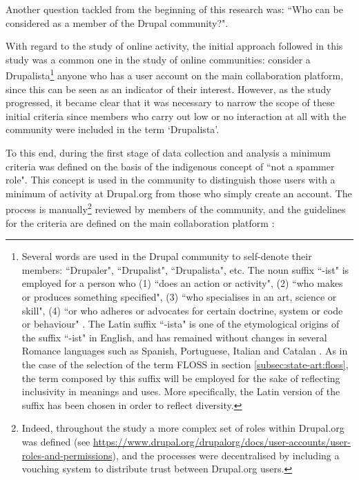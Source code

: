 Another question tackled from the beginning of this research was: ``Who can be considered as a member of the Drupal community?". 

With regard to the study of online activity, the initial approach followed in this study was a common one in the study of online communities: consider a Drupalista\footnote{Several words are used in the Drupal community to self-denote their members: ``Drupaler", ``Drupalist", ``Drupalista", etc. The noun suffix ``-ist" is employed for a person who (1) ``does an action or activity",  (2) ``who makes or produces something specified", (3) ``who specialises in an art, science or skill", (4) ``or who adheres or advocates for certain doctrine, system or code or behaviour" \parencite{merrian-ist2014}. The Latin suffix ``-ista" is one of the etymological origins of the suffix ``-ist" in English, and has remained without changes in several Romance languages such as Spanish, Portuguese, Italian and Catalan \parencite{wiktionary-ista-etimology}. As in the case of the selection of the term FLOSS in section \ref{subsec:state-art:floss}, the term composed by this suffix will be employed for the sake of reflecting inclusivity in meanings and uses. More specifically, the Latin version of the suffix has been chosen in order to reflect diversity.} anyone who has a user account on the main collaboration platform, since this can be seen as an indicator of their interest. However, as the study progressed, it became clear that it was necessary to narrow the scope of these initial criteria since members who carry out low or no interaction at all with the community were included in the term `Drupalista'.

To this end, during the first stage of data collection and analysis a minimum criteria was defined on the basis of the indigenous concept of ``not a spammer role". This concept is used in the community to distinguish those users with a minimum of activity at Drupal.org from those who simply create an account. The process is manually\footnote{Indeed, throughout the study a more complex set of roles within Drupal.org was defined (see \url{https://www.drupal.org/drupalorg/docs/user-accounts/user-roles-and-permissions}), and the processes were decentralised by including a vouching system to distribute trust between Drupal.org users.} reviewed by members of the community, and the guidelines for the criteria are defined on the main collaboration platform \parencite{drupal-not-spammer-role}:


